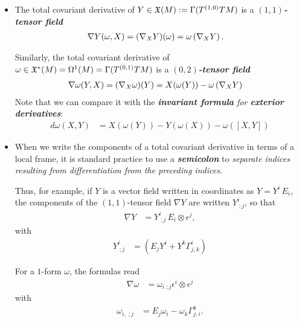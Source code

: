 \documentclass[11pt]{article}
\begin{document}
\begin{itemize}
\item \begin{remark}
The total covariant derivative of $Y \in {\mathfrak X}(M) := \Gamma(T^{(1,0)}TM)$ is a \emph{\textbf{$(1,1)$-tensor field}}
\begin{align*}
\nabla Y (\omega, X) &= (\nabla_{X}{Y})(\omega) = \omega\left(\nabla_{X}{Y}\right).
\end{align*} %

Similarly, the total covariant derivative of $\omega \in {\mathfrak X}^{*}(M) = \Omega^1(M) = \Gamma(T^{(0,1)}TM)$ is a \emph{\textbf{$(0,2)$-tensor field}}
\begin{align*}
\nabla \omega (Y, X) &= (\nabla_{X}{\omega})(Y) = X(\omega(Y)) -  \omega\left(\nabla_{X}{Y}\right)
\end{align*}
Note that we can compare it with the \emph{\textbf{invariant formula} for \textbf{exterior derivatives}}:
\begin{align*}
d \omega (X, Y) &=  X(\omega(Y)) - Y(\omega(X)) - \omega([X, Y])
\end{align*}
\end{remark}

\item \begin{remark}
When we write the components of a total covariant derivative in terms of a local frame, it is standard practice to use a \emph{\textbf{semicolon}} to \emph{separate indices resulting from differentiation from the preceding indices}.

Thus, for example, if $Y$ is a vector field written in coordinates as $Y = Y^i\, E_i$, the components of the $(1,1)$-tensor field $\nabla Y$
are written $Y^i_{\;;j}$, so that
\begin{align*}
\nabla Y &= Y^{i}_{\;;j}\,E_i \otimes \epsilon^j,
\end{align*} with
\begin{align*}
Y^{i}_{\;;j} &= (E_j Y^{i} + Y^k \Gamma_{j,k}^i)
\end{align*}

For a $1$-form $\omega$, the formulas read
\begin{align*}
\nabla \omega &= \omega_{i\;;j} \epsilon^i \otimes \epsilon^j
\end{align*} with 
\begin{align*}
\omega_{i,\;;j} &= E_j \omega_i - \omega_k \Gamma_{j,i}^{k}.
\end{align*}
\end{remark}


\end{itemize}
\end{document}
